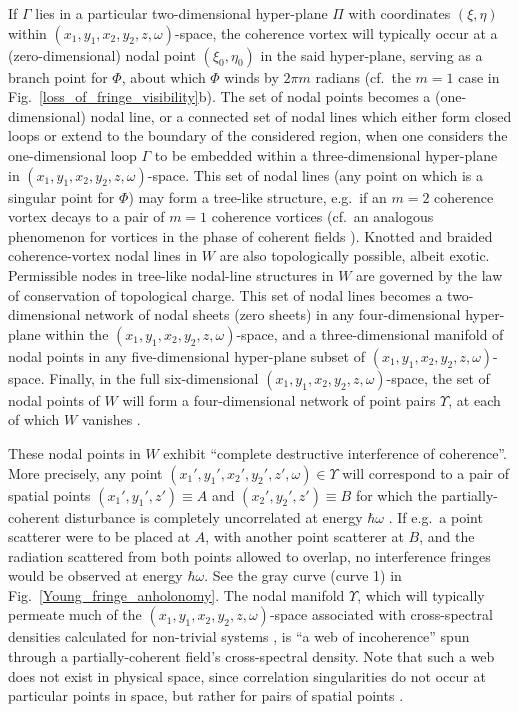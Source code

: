 \documentclass[%
 reprint,
 amsmath,amssymb,
 aps,
]{revtex4-1}
\begin{document}
If $\Gamma$ lies in a particular two-dimensional hyper-plane $\Pi$ with coordinates $(\xi,\eta)$ within $(x_1,y_1,x_2,y_2,z,\omega)$-space, the coherence vortex will typically occur at a (zero-dimensional) nodal point $(\xi_0,\eta_0)$ in the said hyper-plane, serving as a branch point for $\Phi$, about which $\Phi$ winds by $2 \pi m$ radians (cf.~the $m=1$ case in Fig.~\ref{loss_of_fringe_visibility}b).  The set of nodal points becomes a (one-dimensional) nodal line, or a connected set of nodal lines which either form closed loops or extend to the boundary of the considered region, when one considers the one-dimensional loop $\Gamma$ to be embedded within a three-dimensional hyper-plane in  $(x_1,y_1,x_2,y_2,z,\omega)$-space.  This set of nodal lines (any point on which is a singular point for $\Phi$) may form a tree-like structure, e.g.~if an $m=2$ coherence vortex decays to a pair of $m=1$ coherence vortices \cite{TopologicalReactionsCohVortices,GburSPIE} (cf.~an analogous phenomenon for vortices in the phase of coherent fields \cite{Freund1999}).  Knotted and braided coherence-vortex nodal lines in $W$ are also topologically possible, albeit exotic.  Permissible nodes in tree-like nodal-line structures in $W$ are governed by the law of conservation of topological charge.  This set of nodal lines becomes a two-dimensional network of nodal sheets (zero sheets) in any four-dimensional hyper-plane within the $(x_1,y_1,x_2,y_2,z,\omega)$-space, and a three-dimensional manifold of nodal points in any five-dimensional hyper-plane subset of $(x_1,y_1,x_2,y_2,z,\omega)$-space.  Finally, in the full six-dimensional $(x_1,y_1,x_2,y_2,z,\omega)$-space, the set of nodal points of $W$ will form a four-dimensional network of point pairs $\Upsilon$, at each of which $W$ vanishes \cite{Marasinghe2010}. 

These nodal points in $W$ exhibit ``complete destructive interference of coherence''.  More precisely, any point $(x_1',y_1',x_2',y_2',z',\omega)\in\Upsilon$ will correspond to a pair of spatial points $(x_1',y_1',z')\equiv A$ and $(x_2',y_2',z')\equiv B$ for which the partially-coherent disturbance is completely uncorrelated at energy $\hbar\omega$ \cite{Schouten2003,GburVisser2003,Bogatyryova2003}.  If e.g.~a point scatterer were to be placed at $A$, with another point scatterer at $B$, and the radiation scattered from both points allowed to overlap, no interference fringes would be observed at energy $\hbar\omega$.  See the gray curve (curve 1) in Fig.~\ref{Young_fringe_anholonomy}.  The nodal  manifold  $\Upsilon$, which will typically permeate much of the $(x_1,y_1,x_2,y_2,z,\omega)$-space associated with cross-spectral densities calculated for non-trivial systems \cite{TopologicalReactionsCohVortices,GburVisser2003}, is ``a web of incoherence'' spun through a partially-coherent field's cross-spectral density. Note that such a web does not exist in physical space, since correlation singularities do not occur at particular points in space, but rather for pairs of spatial points \cite{GburVisser2003}.   
\end{document}
